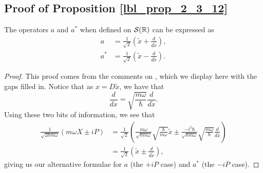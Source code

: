 \subsection{Proof of Proposition \eqref{lbl_prop_2_3_12}}\label{proof_lbl_prop_2_3_12}

\begin{proposition}
  The operators $a$ and $a^*$ when defined on $\mathcal{S}(\mathbb{R})$ can be expressed as
  \begin{align*}
    a   &= \frac{1}{\sqrt{2}}\left( \tilde{x} + \frac{d}{d\tilde{x}} \right), \\
    a^* &= \frac{1}{\sqrt{2}}\left( \tilde{x} - \frac{d}{d\tilde{x}} \right).
  \end{align*}
\end{proposition}
\begin{proof}
  This proof comes from the comments on {\cite[p.232]{Hall2013}}, which we display here with the gaps filled in. Notice that as $x = D \tilde{x}$, we have that
  \begin{equation*}
    \frac{d}{dx} = \sqrt{ \frac{m \omega}{\hbar} } \frac{d}{d \tilde{x}}.
  \end{equation*}
  Using these two bits of information, we see that
  \begin{align*}
    \frac{1}{\sqrt{2 \hbar m \omega}} \left( m \omega X \pm i P  \right)
    &= \frac{1}{\sqrt{2}} \left(  \frac{m \omega}{\sqrt{\hbar m \omega}} \sqrt{\frac{\hbar}{m \omega}} \tilde{x} \pm \frac{-i^2 \hbar}{\sqrt{\hbar m \omega}} \sqrt{\frac{m \omega}{\hbar}} \frac{d}{d \tilde{x}}  \right) \\
    &= \frac{1}{\sqrt{2}} \left( \tilde{x} \pm \frac{d}{d \tilde{x}} \right),
  \end{align*}
  giving us our alternative formulae for $a$ (the $+iP$ case) and $a^*$ (the $-iP$ case).
\end{proof}
